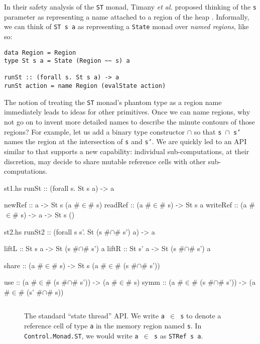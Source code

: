 \documentclass[format=sigplan, review=false, screen=true]{acmart}
\begin{document}
In their safety analysis of the \texttt{ST} monad, Timany \textit{et al.} proposed thinking of the \texttt{s} parameter as
representing a name attached to a region of the heap \cite{timany2017logical}.
Informally, we can think of \texttt{ST s a} as representing a \texttt{State} monad over
\emph{named regions}, like so:
\begin{verbatim}
data Region = Region
type St s a = State (Region ~~ s) a

runSt :: (forall s. St s a) -> a
runSt action = name Region (evalState action)
\end{verbatim}

The notion of treating the \texttt{ST} monad's phantom type as a region name immediately leads to ideas for
other primitives. Once we can name regions, why not go on to invent more detailed names to describe
the minute contours of those regions? For example, let us add a binary type constructor $\cap$ so that \texttt{s $\cap$ s'}
names the region at the intersection of \texttt{s} and \texttt{s'}. We are quickly led to an API similar to  that
supports a new capability: individual sub-computations, at their discretion, may decide to share mutable reference cells with other sub-computations.

\begin{filecontents*}{st1.hs}
runSt    :: (forall s. St s a) -> a

newRef   :: a -> St s (a #$\in$# s)
readRef  :: (a #$\in$# s) -> St s a
writeRef :: (a #$\in$# s) -> a -> St s ()
\end{filecontents*}

\begin{filecontents*}{st2.hs}
runSt2 :: (forall s s'. St (s #$\cap$# s') a) -> a

liftL :: St s a -> St (s #$\cap$# s') a
liftR :: St s' a -> St (s #$\cap$# s') a

share :: (a #$\in$# s) -> St s (a #$\in$# (s #$\cap$# s'))

use  :: (a #$\in$# (s #$\cap$# s')) -> (a #$\in$# s)
symm :: (a #$\in$# (s #$\cap$# s')) -> (a #$\in$# (s' #$\cap$# s))
\end{filecontents*}

\begin{figure}
  \inputminted{haskell}{st1.hs}
  \caption{The standard ``state thread'' API. We write \texttt{a $\in$ s} to
    denote a reference cell of type \texttt{a} in the memory region named \texttt{s}.
    In \texttt{Control.Monad.ST}, we would write \texttt{a $\in$ s} as
    \texttt{STRef s a}.\label{st-api}}
\end{figure}
\end{document}
